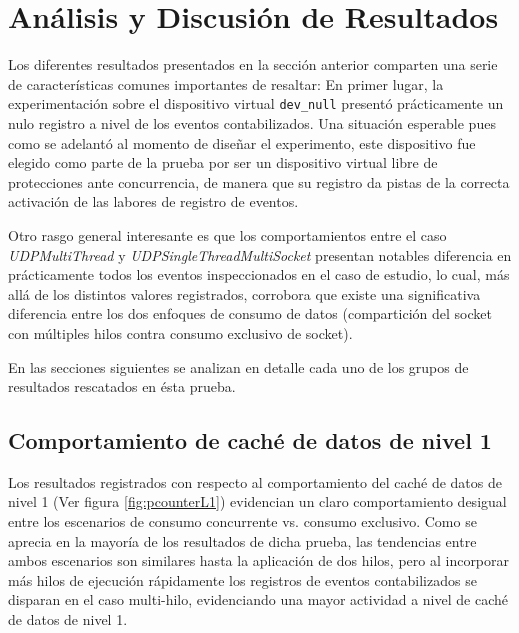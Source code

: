 \section{Análisis y Discusión de Resultados}

Los diferentes resultados presentados en la sección anterior comparten una serie de características comunes importantes de resaltar: En primer lugar, la experimentación sobre el dispositivo virtual \verb=dev_null= presentó prácticamente un nulo registro a nivel de los eventos contabilizados. Una situación esperable pues como se adelantó al momento de diseñar el experimento, este dispositivo fue elegido como parte de la prueba por ser un dispositivo virtual libre de protecciones ante concurrencia, de manera que su registro da pistas de la correcta activación de las labores de registro de eventos.

Otro rasgo general interesante es que los comportamientos entre el caso \emph{UDPMultiThread} y \emph{UDPSingleThreadMultiSocket} presentan notables diferencia en prácticamente todos los eventos inspeccionados en el caso de estudio, lo cual, más allá de los distintos valores registrados, corrobora que existe una significativa diferencia entre los dos enfoques de consumo de datos (compartición del socket con múltiples hilos contra consumo exclusivo de socket).

En las secciones siguientes se analizan en detalle cada uno de los grupos de resultados rescatados en ésta prueba.

\subsection{Comportamiento de caché de datos de nivel 1}
Los resultados registrados con respecto al comportamiento del caché de datos de nivel 1 (Ver figura \ref{fig:pcounterL1}) evidencian un claro comportamiento desigual entre los escenarios de consumo concurrente vs. consumo exclusivo. Como se aprecia en la mayoría de los resultados de dicha prueba, las tendencias entre ambos escenarios son similares hasta la aplicación de dos hilos, pero al incorporar más hilos de ejecución rápidamente los registros de eventos contabilizados se disparan en el caso multi-hilo, evidenciando una mayor actividad a nivel de caché de datos de nivel 1.

